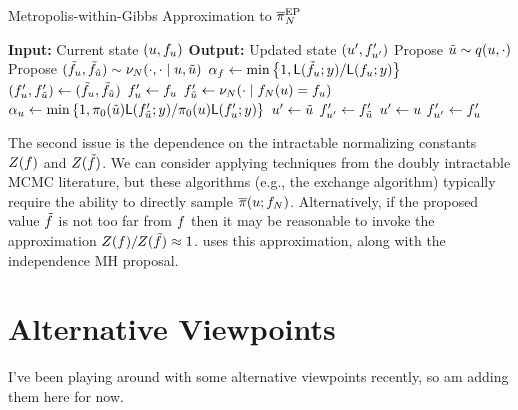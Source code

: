 \documentclass[12pt]{article}
\begin{document}
\begin{algorithm}
    \caption{Metropolis-within-Gibbs Approximation to $\overline{\pi}_{N}^{\mathrm{EP}}$}
    \label{alg:mwg-ep}
    \begin{algorithmic}[1] 
    \State \textbf{Input:} Current state $(u, f_u)$
    \State \textbf{Output:} Updated state $(u^\prime, f^\prime_{u^\prime})$
     \State Propose $\tilde{u} \sim q(u, \cdot)$
     \State Propose $(\tilde{f}_u, \tilde{f}_{\tilde{u}}) \sim \nu_{N}(\cdot, \cdot \mid u, \tilde{u})$ 
     \State $\alpha_{f} \gets \min\left\{1, \mathsf{L}(\tilde{f}_u; y) / \mathsf{L}(f_u; y) \right\}$
                \State $(f^\prime_u, f^\prime_{\tilde{u}}) \gets (\tilde{f}_u, \tilde{f}_{\tilde{u}})$ 
            \Else
                \State $f^\prime_{u} \gets f_{u}$
                \State $f^\prime_{\tilde{u}} \gets \nu_{N}(\cdot \mid f_{N}(u) = f_u)$
            \EndIf
      \State $\alpha_{u} \gets \min\left\{1, \pi_0(\tilde{u} )\mathsf{L}(f^\prime_{\tilde{u}}; y) / \pi_0(u) \mathsf{L}(f^\prime_{u}; y) \right\}$ 
                \State $u^\prime \gets \tilde{u}$
                \State $f^\prime_{u^\prime} \gets f^\prime_{\tilde{u}}$ 
            \Else
            	\State $u^\prime \gets u$
		\State $f^\prime_{u^\prime} \gets f^\prime_{u}$
            \EndIf
    \end{algorithmic}
\end{algorithm}

The second issue is the dependence on the intractable normalizing constants 
$Z(f)$ and $Z(\tilde{f})$. We can consider applying techniques
from the doubly intractable MCMC literature, but these algorithms (e.g., the exchange algorithm)
typically require the ability to directly sample $\overline{\pi}(u; f_{N})$.
Alternatively, if the proposed value $\tilde{f}$ is not too far from $f$ then it may be 
reasonable to invoke the approximation $Z(f) / Z(\tilde{f}) \approx 1$.
 uses this approximation, along with the independence MH proposal.
 
\section{Alternative Viewpoints}
I've been playing around with some alternative viewpoints recently, so am adding them here for now.
\end{document}
